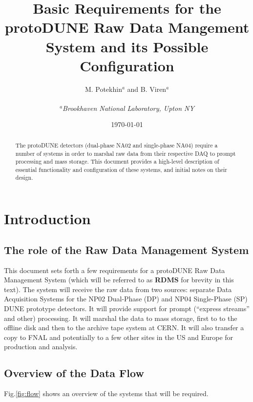\documentclass[pdftex,12pt,letter]{article}
\title{Basic Requirements for the protoDUNE Raw Data Mangement System and its Possible Configuration}
\date{\today}
\author{M. Potekhin$^a$ and B. Viren$^a$\\
\ \\
$^a$\textit{Brookhaven National Laboratory, Upton NY}
}
\begin{document}
\maketitle

\begin{abstract}
The protoDUNE detectors (dual-phase NA02 and single-phase NA04)
require a number of systems in order to marshal raw data from
their respective DAQ to prompt processing and mass storage.  This
document provides a high-level description of essential functionality and
configuration of these systems, and initial notes on their design.
\end{abstract}
\pagebreak
\tableofcontents

\pagebreak

\section{Introduction}
\subsection{The role of the Raw Data Management System}
This document sets forth a few requirements for a protoDUNE Raw Data Management System
(which will be referred to as \textbf{RDMS} for brevity in this text).  The system will receive the raw data from
two sources: separate Data Acquisition Systems for the NP02 Dual-Phase (DP) and NP04 Single-Phase (SP) DUNE prototype detectors.
It will provide support for prompt (``express streams'' and other) processing.  It will marshal the data to mass storage, first
to to the offline disk and then to the archive tape system at CERN. It will also transfer a copy to FNAL and potentially
to a few other sites in the US and Europe for production and analysis.

\subsection{Overview of the Data Flow}
Fig.\ref{fig:flow} shows an overview of the systems that will be required.
\end{document}
